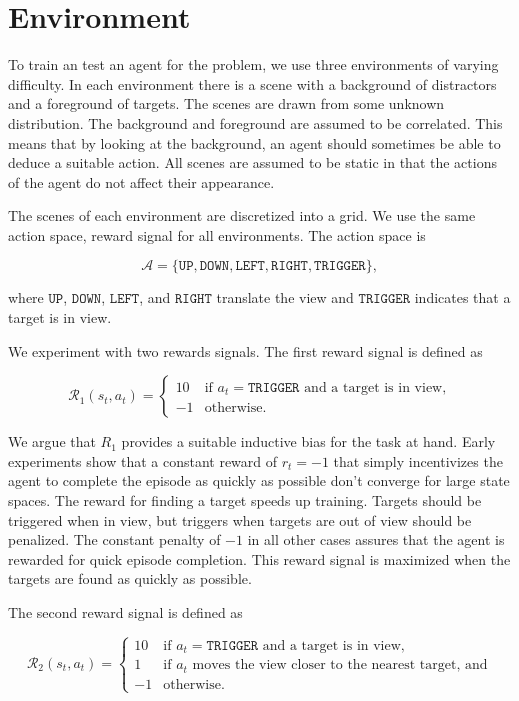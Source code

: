 \section{Environment}
\label{sec:environment}

To train an test an agent for the problem, we use three environments of varying difficulty.
In each environment there is a scene with a background of distractors and a foreground of targets.
The scenes are drawn from some unknown distribution.
The background and foreground are assumed to be correlated.
This means that by looking at the background, an agent should sometimes be able to deduce a suitable action.
All scenes are assumed to be static in that the actions of the agent do not affect their appearance.

The scenes of each environment are discretized into a grid.
We use the same action space, reward signal for all environments.
The action space is

\[
    \mathcal{A} = \lbrace \mathtt{UP}, \mathtt{DOWN}, \mathtt{LEFT}, \mathtt{RIGHT}, \mathtt{TRIGGER} \rbrace,
\]

where \(\mathtt{UP}\), \(\mathtt{DOWN}\), \(\mathtt{LEFT}\), and \(\mathtt{RIGHT}\) translate the view and \(\mathtt{TRIGGER}\) indicates that a target is in view.


We experiment with two rewards signals. The first reward signal is defined as

\[
    \mathcal{R}_1(s_t, a_t) =
    \begin{cases}
        10 & \text{if \(a_t = \mathtt{TRIGGER}\) and a target is in view,} \\
        -1 & \text{otherwise.}
    \end{cases}
\]

We argue that \(R_1\) provides a suitable inductive bias for the task at hand.
Early experiments show that a constant reward of \(r_t = -1\) that simply incentivizes the agent to complete the episode as quickly as possible don't converge for large state spaces.
The reward for finding a target speeds up training.
Targets should be triggered when in view, but triggers when targets are out of view should be penalized.
The constant penalty of \(-1\) in all other cases assures that the agent is rewarded for quick episode completion.
This reward signal is maximized when the targets are found as quickly as possible.

The second reward signal is defined as

\[
    \mathcal{R}_2(s_t, a_t) =
    \begin{cases}
        10 & \text{if \(a_t = \mathtt{TRIGGER}\) and a target is in view,} \\
         1 & \text{if \(a_t\) moves the view closer to the nearest target, and} \\
        -1 & \text{otherwise.}
    \end{cases}
\]


